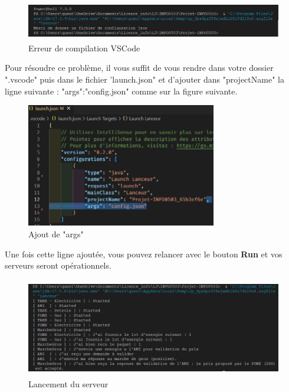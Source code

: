 \begin{figure}[h]
    \centering
    \includegraphics[width= 139mm, height=17mm]{images/ErreurVSCODE.png}
    \caption{Erreur de compilation VSCode}
    \label{img:mesh8}
\end{figure}

Pour résoudre ce problème, il vous suffit de vous rendre dans votre dossier ".vscode" puis dans le fichier 'launch.json" et d'ajouter dans "projectName" la ligne suivante : "args":"config.json" comme sur la figure suivante.

\begin{figure}[h]
    \centering
    \includegraphics[width= 83mm, height=54mm]{images/lauchjson.png}
    \caption{Ajout de "args"}
    \label{img:mesh9}
\end{figure}

Une fois cette ligne ajoutée, vous pouvez relancer avec le bouton \textbf{Run} et vos serveurs seront opérationnels.
\begin{figure}[h]
    \centering
    \includegraphics[width= 137mm, height=43mm]{images/VScodeProject.png}
    \caption{Lancement du serveur}
    \label{img:mesh10}
\end{figure}

\newpage